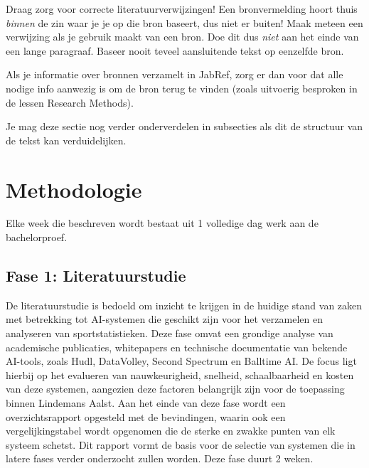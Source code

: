 Draag zorg voor correcte literatuurverwijzingen! Een bronvermelding hoort thuis \emph{binnen} de zin waar je je op die bron baseert, dus niet er buiten! Maak meteen een verwijzing als je gebruik maakt van een bron. Doe dit dus \emph{niet} aan het einde van een lange paragraaf. Baseer nooit teveel aansluitende tekst op eenzelfde bron.

Als je informatie over bronnen verzamelt in JabRef, zorg er dan voor dat alle nodige info aanwezig is om de bron terug te vinden (zoals uitvoerig besproken in de lessen Research Methods).


Je mag deze sectie nog verder onderverdelen in subsecties als dit de structuur van de tekst kan verduidelijken.

\section{Methodologie}%
\label{sec:methodologie}

Elke week die beschreven wordt bestaat uit 1 volledige dag werk aan de bachelorproef.
\subsection{Fase 1: Literatuurstudie}
De literatuurstudie is bedoeld om inzicht te krijgen in de huidige stand van zaken met betrekking tot AI-systemen die geschikt zijn voor het verzamelen en analyseren van sportstatistieken. Deze fase omvat een grondige analyse van academische publicaties, whitepapers en technische documentatie van bekende AI-tools, zoals Hudl, DataVolley, Second Spectrum en Balltime AI. De focus ligt hierbij op het evalueren van nauwkeurigheid, snelheid, schaalbaarheid en kosten van deze systemen, aangezien deze factoren belangrijk zijn voor de toepassing binnen Lindemans Aalst. Aan het einde van deze fase wordt een overzichtsrapport opgesteld met de bevindingen, waarin ook een vergelijkingstabel wordt opgenomen die de sterke en zwakke punten van elk systeem schetst. Dit rapport vormt de basis voor de selectie van systemen die in latere fases verder onderzocht zullen worden. Deze fase duurt 2 weken.
